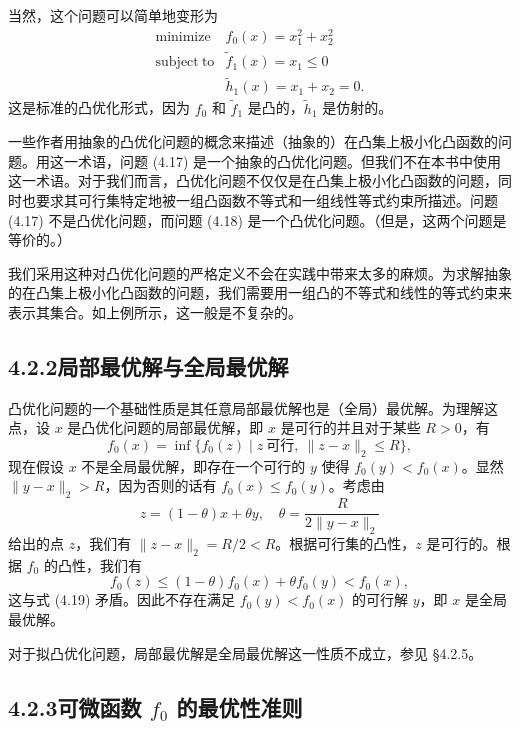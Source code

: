 \documentclass[UTF8, 12pt, fontset=fandol, oneside]{ctexart}
\begin{document}
当然，这个问题可以简单地变形为
\begin{equation}
\begin{array}{ll}
\mathop{\mathrm{minimize}} & f_0(x)=x_1^2+x_2^2\\
\mathrm{subject\ to} & \tilde{f}_1(x)=x_1\leq 0\\
& \tilde{h}_1(x)=x_1+x_2=0.
\end{array}
\tag{4.18}
\end{equation}
这是标准的凸优化形式，因为 $f_0$ 和 $\tilde{f}_1$ 是凸的，$\tilde{h}_1$ 是仿射的。

一些作者用抽象的凸优化问题的概念来描述（抽象的）在凸集上极小化凸函数的问题。用这一术语，问题 (4.17) 是一个抽象的凸优化问题。但我们不在本书中使用这一术语。对于我们而言，凸优化问题不仅仅是在凸集上极小化凸函数的问题，同时也要求其可行集特定地被一组凸函数不等式和一组线性等式约束所描述。问题 (4.17) 不是凸优化问题，而问题 (4.18) 是一个凸优化问题。（但是，这两个问题是等价的。）

我们采用这种对凸优化问题的严格定义不会在实践中带来太多的麻烦。为求解抽象的在凸集上极小化凸函数的问题，我们需要用一组凸的不等式和线性的等式约束来表示其集合。如上例所示，这一般是不复杂的。

\subsection*{4.2.2\quad 局部最优解与全局最优解}

凸优化问题的一个基础性质是其任意局部最优解也是（全局）最优解。为理解这点，设 $x$ 是凸优化问题的局部最优解，即 $x$ 是可行的并且对于某些 $R>0$，有
\begin{equation}
f_0(x)=\inf\{f_0(z)\mid z\ \text{可行},\ \|z-x\|_2\leq R\},
\tag{4.19}
\end{equation}
现在假设 $x$ 不是全局最优解，即存在一个可行的 $y$ 使得 $f_0(y)<f_0(x)$。显然 $\|y-x\|_2>R$，因为否则的话有 $f_0(x)\leq f_0(y)$。考虑由
\[
z=(1-\theta)x+\theta y,\quad \theta=\frac{R}{2\|y-x\|_2}
\]
给出的点 $z$，我们有 $\|z-x\|_2=R/2<R$。根据可行集的凸性，$z$ 是可行的。根据 $f_0$ 的凸性，我们有
\[
f_0(z)\leq (1-\theta)f_0(x)+\theta f_0(y)<f_0(x),
\]
这与式 (4.19) 矛盾。因此不存在满足 $f_0(y)<f_0(x)$ 的可行解 $y$，即 $x$ 是全局最优解。

对于拟凸优化问题，局部最优解是全局最优解这一性质不成立，参见 §4.2.5。

\subsection*{4.2.3\quad 可微函数 $f_0$ 的最优性准则}
\end{document}
